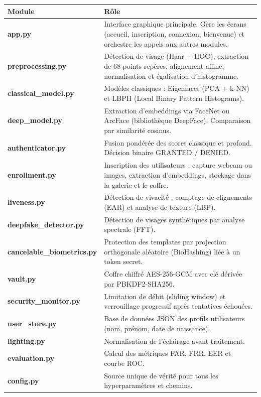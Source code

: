 \documentclass[12pt,a4paper]{article}
\begin{document}
\begin{longtable}{>{\bfseries}p{3.8cm} p{10cm}}
\toprule
Module & Rôle \\
\midrule
\endhead
\bottomrule
\endfoot
app.py & Interface graphique principale. Gère les écrans (accueil, inscription,
         connexion, bienvenue) et orchestre les appels aux autres modules. \\[4pt]
preprocessing.py & Détection de visage (Haar + HOG), extraction de 68 points
                   repères, alignement affine, normalisation et égalisation
                   d'histogramme. \\[4pt]
classical\_model.py & Modèles classiques : Eigenfaces (PCA + k-NN) et LBPH
                      (Local Binary Pattern Histograms). \\[4pt]
deep\_model.py & Extraction d'embeddings via FaceNet ou ArcFace (bibliothèque
                 DeepFace). Comparaison par similarité cosinus. \\[4pt]
authenticator.py & Fusion pondérée des scores classique et profond.
                   Décision binaire GRANTED / DENIED. \\[4pt]
enrollment.py & Inscription des utilisateurs : capture webcam ou images,
                extraction d'embeddings, stockage dans la galerie et le coffre. \\[4pt]
liveness.py & Détection de vivacité : comptage de clignements (EAR) et
              analyse de texture (LBP). \\[4pt]
deepfake\_detector.py & Détection de visages synthétiques par analyse spectrale
                        (FFT). \\[4pt]
cancelable\_biometrics.py & Protection des templates par projection orthogonale
                             aléatoire (BioHashing) liée à un token secret. \\[4pt]
vault.py & Coffre chiffré AES-256-GCM avec clé dérivée par PBKDF2-SHA256. \\[4pt]
security\_monitor.py & Limitation de débit (sliding window) et verrouillage
                       progressif après tentatives échouées. \\[4pt]
user\_store.py & Base de données JSON des profils utilisateurs
                 (nom, prénom, date de naissance). \\[4pt]
lighting.py & Normalisation de l'éclairage avant traitement. \\[4pt]
evaluation.py & Calcul des métriques FAR, FRR, EER et courbe ROC. \\[4pt]
config.py & Source unique de vérité pour tous les hyperparamètres et chemins. \\
\end{longtable}
\end{document}
